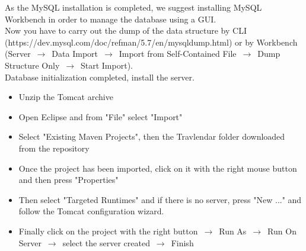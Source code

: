 \documentclass[numbers=noenddot, 12pt, a4paper, oneside]{scrbook}
\begin{document}
As the MySQL installation is completed, we suggest installing MySQL Workbench in order to manage the database using a GUI. \\
Now you have to carry out the dump of the data structure by CLI\\
(https://dev.mysql.com/doc/refman/5.7/en/mysqldump.html)
or by Workbench (Server $\,\to\,$ Data Import $\,\to\,$ Import from Self-Contained File $\,\to\,$ Dump Structure Only $\,\to\,$ Start Import).\\

Database initialization completed, install the server.

\begin{itemize}
	\item Unzip the Tomcat archive
	\item Open Eclipse and from "File" select "Import"
	\item Select "Existing Maven Projects", then the Travlendar folder downloaded from the repository
	\item Once the project has been imported, click on it with the right mouse button and then press "Properties"
	\item Then select "Targeted Runtimes" and if there is no server, press "New ..." and follow the Tomcat configuration wizard.
	\item Finally click on the project with the right button $\,\to\,$  Run As $\,\to\,$ Run On Server $\,\to\,$ select the server created $\,\to\,$ Finish
\end{itemize}
\end{document}
